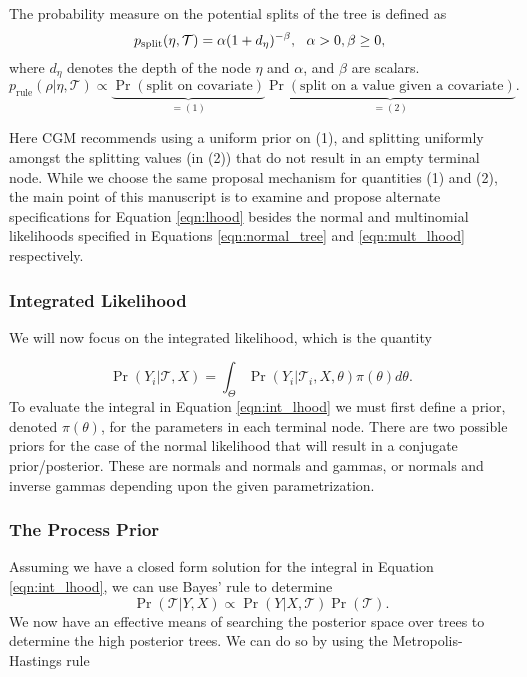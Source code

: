 \documentclass{article}
\begin{document}
The probability measure on the potential splits of the tree is defined as
\begin{equation}\label{eqn:psplit}
p_{\text{split}}(\eta, \mathcal{T})=\alpha(1+d_{\eta})^{-\beta}, \ \ \alpha>0, \beta\geq 0,\\
\end{equation}
where $d_{\eta}$ denotes the depth of the node $\eta$ and $\alpha$, and $\beta$ are scalars. 
\begin{equation}\label{eqn:prule}
p_{\text{rule}}(\rho \vert \eta, \mathcal{T}) \propto \underbrace{\Pr(\text{split on covariate})}_{=(1)}\underbrace{\Pr(\text{split on a value given a covariate})}_{=(2)}. 
\end{equation}

Here CGM recommends using a uniform prior on (1), and splitting uniformly amongst the splitting values (in (2)) that do not result in an empty terminal node. While we choose the same proposal mechanism for quantities (1) and  (2), the main point of this manuscript is to examine and propose alternate specifications for Equation \ref{eqn:lhood} besides the normal and multinomial likelihoods specified in Equations \ref{eqn:normal_tree} and \ref{eqn:mult_lhood} respectively. 

\subsubsection{Integrated Likelihood}
We will now focus on the integrated likelihood, which is the quantity 

\begin{equation}\label{eqn:int_lhood}
\Pr(Y_i \vert \mathcal{T}, X) = \int_{\Theta}\Pr(Y_i \vert \mathcal{T}_i, X, \theta)\pi(\theta)d\theta.
\end{equation}
To evaluate the integral in Equation \ref{eqn:int_lhood} we must first define a prior, denoted $\pi(\theta)$, for the parameters in each terminal node. 
There are two possible priors for the case of the normal likelihood that will result in a conjugate prior/posterior. These are normals and normals and gammas, or normals and inverse gammas depending upon the given parametrization. 


\subsubsection{The Process Prior}

Assuming we have a closed form solution for the integral in Equation \ref{eqn:int_lhood}, we can use Bayes' rule to determine 
\begin{equation}\label{eqn:tree_post}
\Pr(\mathcal{T} \vert Y , X) \propto \Pr(Y \vert X ,\mathcal{T})\Pr(\mathcal{T}).
\end{equation} 
We now have an effective means of searching the posterior space over trees to determine the high posterior trees. We can do so by using the Metropolis-Hastings rule 
\end{document}
